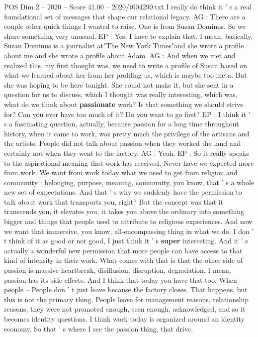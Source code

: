 \begin{textsample}{POS Dim 2 – 2020 – Score 41.00 – 2020/t004290.txt}
I really do think it ' s a real foundational set of messages that shape our relational legacy.
AG : There are a couple other quick things I wanted to raise.
One is from Susan Dominus.
So we share something very unusual.
EP : Yes, I have to explain that.
I mean, basically, Susan Dominus is a journalist at"The New York Times"and she wrote a profile about me and she wrote a profile about Adam.
AG : And when we met and realized this, my first thought was, we need to write a profile of Susan based on what we learned about her from her profiling us, which is maybe too meta.
But she was hoping to be here tonight.
She could not make it, but she sent in a question for us to discuss, which I thought was really interesting, which was, what do we think about \textbf{passionate} work?
Is that something we should strive for?
Can you ever have too much of it?
Do you want to go first?
EP : I think it ' s a fascinating question, actually, because passion for a long time throughout history, when it came to work, was pretty much the privilege of the artisans and the artists.
People did not talk about passion when they worked the land and certainly not when they went to the factory.
AG : Yeah.
EP : So it really speaks to the aspirational meaning that work has received.
Never have we expected more from work.
We want from work today what we used to get from religion and community : belonging, purpose, meaning, community, you know, that ' s a whole new set of expectations.
And that ' s why we suddenly have the permission to talk about work that transports you, right?
But the concept was that it transcends you, it elevates you, it takes you above the ordinary into something bigger and things that people used to attribute to religious experiences.
And now we want that immersive, you know, all-encompassing thing in what we do.
I don ' t think of it as good or not good, I just think it ' s \textbf{super} interesting.
And it ' s actually a wonderful new permission that more people can have access to that kind of intensity in their work.
What comes with that is that the other side of passion is massive heartbreak, disillusion. disruption, degradation.
I mean, passion has its side effects.
And I think that today you have that too.
When people -- People don ' t just leave because the factory closes.
That happens, but this is not the primary thing.
People leave for management reasons, relationship reasons, they were not promoted enough, seen enough, acknowledged, and so it becomes identity questions.
I think work today is organized around an identity economy.
So that ' s where I see the passion thing, that drive.

\end{textsample}
